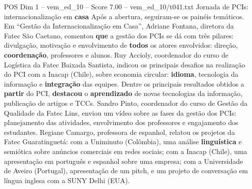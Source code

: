 \begin{textsample}{POS Dim 1 – vem\_ed\_10 – Score 7.00 – vem\_ed\_10/t041.txt}  \label{ex:f1_pos_120}
Jornada de PCIs: internacionalização em \textbf{casa} Após a abertura, seguiram-se os painéis temáticos.
Em “Gestão da Internacionalização em Casa”, Adriane Fontana, diretora da Fatec São Caetano, comentou \textbf{que} a gestão dos PCIs se dá com três pilares: divulgação, motivação e envolvimento de \textbf{todos} os atores envolvidos: direção, \textbf{coordenação}, professores e alunos.
Ruy Accioly, coordenador do curso de Logística da Fatec Baixada Santista, indicou os principais desafios na realização do PCI com a Inacap (Chile), sobre economia circular: \textbf{idioma}, tecnologia da informação e \textbf{integração} das equipes.
Dentre os principais resultados obtidos a \textbf{partir} do PCI, \textbf{destacou} o \textbf{aprendizado} de novas tecnologias da informação, publicação de artigos e TCCs.
Sandro Pinto, coordenador do curso de Gestão da Qualidade da Fatec Lins, enviou um vídeo sobre as fases da gestão dos PCIs: planejamento das atividades, envolvimento dos professores e engajamento dos estudantes.
Regiane Camargo, professora de espanhol, relatou os projetos da Fatec Guaratinguetá: com a Uniminuto (Colômbia), uma análise \textbf{linguística} e semiótica sobre anúncios comerciais em redes sociais; com a Inacap (Chile), uma apresentação em português e espanhol sobre uma empresa; com a Universidade de Aveiro (Portugal), apresentação de um pitch, e um projeto de conversação em língua inglesa com a SUNY Delhi (EUA).

\end{textsample}
